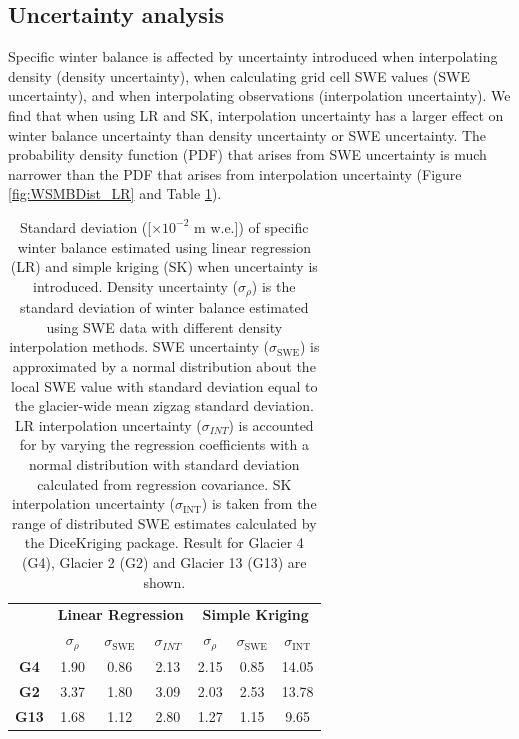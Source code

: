 \documentclass[review,oneside, letterpaper]{igs}
\begin{document}
\subsection{Uncertainty analysis}

Specific winter balance is affected by uncertainty introduced when interpolating density (density uncertainty), when calculating grid cell SWE values (SWE uncertainty), and when interpolating observations (interpolation uncertainty). We find that when using LR and SK, interpolation uncertainty has a larger effect on winter balance uncertainty than density uncertainty or SWE uncertainty. The probability density function (PDF) that arises from SWE uncertainty is much narrower than the PDF that arises from interpolation uncertainty (Figure \ref{fig:WSMBDist_LR} and Table \ref{tab:WSMBdistribution_sigma}).

 \begin{table}[]
\centering
\caption{Standard deviation ([$\times10^{-2}$ m w.e.]) of specific winter balance estimated using linear regression (LR) and simple kriging (SK) when uncertainty is introduced. Density uncertainty ($\sigma_{\rho}$) is the standard deviation of winter balance estimated using SWE data with different density interpolation methods. SWE uncertainty ($\sigma_{\mathrm{SWE}}$) is approximated by a normal distribution about the local SWE value with standard deviation equal to the glacier-wide mean zigzag standard deviation. LR interpolation uncertainty ($\sigma_{INT}$) is accounted for by varying the regression coefficients with a normal distribution with standard deviation calculated from regression covariance. SK interpolation uncertainty ($\sigma_{\mathrm{INT}}$) is taken from the range of distributed SWE estimates calculated by the DiceKriging package. Result for Glacier 4 (G4), Glacier 2 (G2) and Glacier 13 (G13) are shown.}
\label{tab:WSMBdistribution_sigma}
\begin{tabular}{ccccccc}
\textbf{} & \multicolumn{3}{c}{\textbf{Linear Regression}} & \multicolumn{3}{c}{\textbf{Simple Kriging}} \\
 & $\sigma_{\rho}$ & $\sigma_{\mathrm{SWE}}$ & $\sigma_{INT}$ & $\sigma_{\rho}$ & $\sigma_{\mathrm{SWE}}$ & $\sigma_{\mathrm{INT}}$ \\
\midrule
\textbf{G4} & 1.90 & 0.86 & 2.13 & 2.15 & 0.85 & 14.05 \\
\textbf{G2} &3.37 & 1.80 & 3.09 & 2.03 & 2.53 & 13.78 \\
\textbf{G13} & 1.68 & 1.12 & 2.80 & 1.27 & 1.15 & 9.65
\end{tabular}
\end{table}
\end{document}
